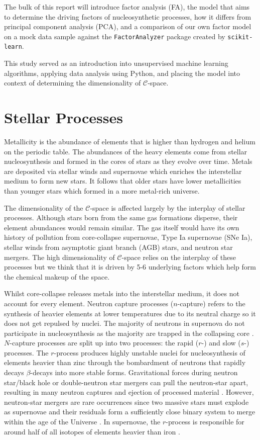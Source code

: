 \documentclass[12pt, letterpaper]{article}
\begin{document}
The bulk of this report will introduce factor analysis (FA), the model that aims to determine the driving factors of nucleosynthetic processes, how it differs from principal component analysis (PCA), and a comparison of our own factor model on a mock data sample against the \texttt{FactorAnalyzer} package created by \texttt{scikit-learn}.


This study served as an introduction into unsupervised machine learning algorithms, applying data analysis using Python, and placing the model into context of determining the dimensionality of $\mathcal{C}$-space.


\section{Stellar Processes}
Metallicity is the abundance of elements that is higher than hydrogen and helium on the periodic table. The abundances of the heavy elements come from stellar nucleosynthesis and formed in the cores of stars as they evolve over time. Metals are deposited via stellar winds and supernovae which enriches the interstellar medium to form new stars. It follows that older stars have lower metallicities than younger stars which formed in a more metal-rich universe. 

The dimensionality of the $\mathcal{C}$-space is affected largely by the interplay of stellar processes. Although stars born from the same gas formations disperse, their element abundances would remain similar. The gas itself would have its own history of pollution from core-collapse supernovae, Type Ia supernovae (SNe Ia), stellar winds from asymptotic giant branch (AGB) stars, and neutron star mergers. The high dimensionality of $\mathcal{C}$-space relies on the interplay of these processes but we think that it is driven by 5-6 underlying factors which help form the chemical makeup of the space. 

Whilst core-collapse releases metals into the interstellar medium, it does not account for every element. Neutron capture processes ($n$-capture) refers to the synthesis of heavier elements at lower temperatures due to its neutral charge so it does not get repulsed by nuclei. The majority of neutrons in supernova do not participate in nucleosynthesis as the majority are trapped in the collapsing core \citep{thompson2001physics}. $N$-capture processes are split up into two processes: the rapid ($r$-) and slow ($s$-) processes. The $r$-process produces highly unstable nuclei for nucleosynthesis of elements heavier than zinc through the bombardment of neutrons that rapidly decays $\beta$-decays into more stable forms. Gravitational forces during neutron star/black hole or double-neutron star mergers can pull the neutron-star apart, resulting in many neutron captures and ejection of processed material \citep{lattimer1977decompression}. However, neutron-star mergers are rare occurrences since two massive stars must explode as supernovae and their residuals form a sufficiently close binary system to merge within the age of the Universe \citep{abbott2017gw170817}. In supernovae, the $r$-process is responsible for around half of all isotopes of elements heavier than iron \citep{qian1998}.
\end{document}

